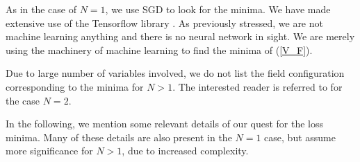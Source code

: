 \documentclass[12pt,a4paper]{JHEP3}
\newcommand{\refb}[1]{(\ref{#1})}
\begin{document}
As in the case of $N=1$, we use SGD to look for the minima. We have made extensive use of the Tensorflow library \cite{tensorflow2015-whitepaper}. As previously stressed, we are not machine learning anything and there is no neural network in sight. We are merely using the machinery of machine learning to find the minima of \refb{V_F}. 

Due to large number of variables involved, we do not list the field configuration corresponding to the minima for $N>1$. The interested reader is referred to \cite{Chowdhury:2015gbk} for the case $N=2$.

In the following, we mention some relevant details of our quest for the loss minima. Many of these details are also present in the $N=1$ case, but assume more significance for $N>1$, due to increased complexity.
\end{document}
